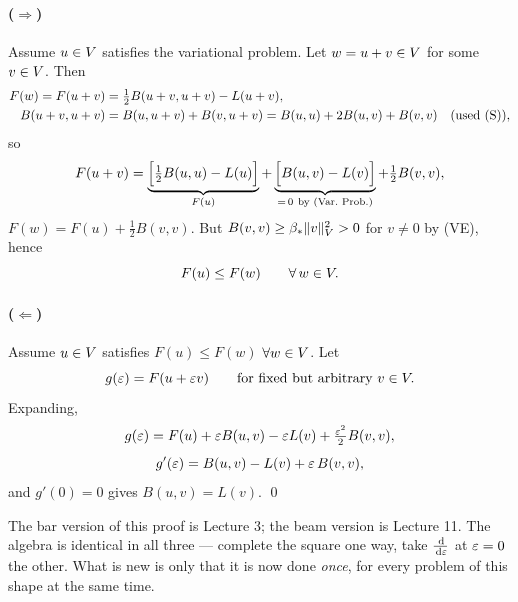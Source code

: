 \paragraph{($\Longrightarrow$)} Assume $u\in V$ satisfies the variational
problem. Let $w=u+v\in V$ for some $v\in V$. Then
\begin{align}
  F(w)=F(u+v)&=\tfrac12 B(u+v,u+v)-L(u+v),\notag\\
  B(u+v,u+v)&=B(u,u+v)+B(v,u+v)=B(u,u)+2B(u,v)+B(v,v)
     \quad\text{(used (S))},\label{eq:l13expand}
\end{align}
so
\begin{equation}\label{eq:l13complete}
  F(u+v)=\underbrace{\Bigl[\tfrac12 B(u,u)-L(u)\Bigr]}_{F(u)}
   +\underbrace{\Bigl[B(u,v)-L(v)\Bigr]}_{=\,0\ \text{by (Var.\ Prob.)}}
   +\tfrac12 B(v,v),
\end{equation}
\ie $F(w)=F(u)+\tfrac12 B(v,v)$. But $B(v,v)\ge\beta_{*}\lVert v\rVert^{2}_{V}>0$
for $v\neq0$ by (VE), hence
\begin{equation}
  F(u)\le F(w)\qquad\forall\,w\in V .
\end{equation}

\paragraph{($\Longleftarrow$)} Assume $u\in V$ satisfies $F(u)\le F(w)$
$\forall w\in V$. Let
\begin{equation}\label{eq:l13g}
  g(\varepsilon)=F(u+\varepsilon v)\qquad\text{for fixed but arbitrary } v\in V .
\end{equation}
Expanding,
\begin{equation}\label{eq:l13gexp}
  g(\varepsilon)=F(u)+\varepsilon B(u,v)-\varepsilon L(v)+\tfrac{\varepsilon^{2}}{2}B(v,v),
\end{equation}
\begin{equation}\label{eq:l13gprime}
  g'(\varepsilon)=B(u,v)-L(v)+\varepsilon\,B(v,v),
\end{equation}
and $g'(0)=0$ gives $B(u,v)=L(v)$. \qed

\begin{recall}
The bar version of this proof is Lecture 3; the beam version is Lecture 11.
The algebra is identical in all three --- complete the square one way, take
$\tfrac{\,\mathrm{d}}{\,\mathrm{d}\varepsilon}$ at $\varepsilon=0$ the other. What is new is only that it is
now done \emph{once}, for every problem of this shape at the same time.
\end{recall}

